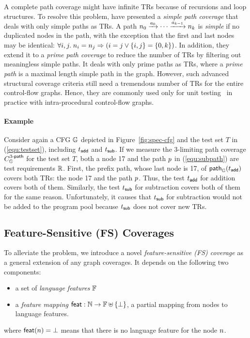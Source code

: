 
A complete path coverage might have infinite TRs because of recursions and loop
structures.
%
To resolve this problem, \citet{testing} have presented a \textit{simple path
coverage} that deals with only simple paths as TRs.
%
A path $n_0 \xrightarrow{a_0} \cdots \xrightarrow{a_{k-1}} n_k$ is
\textit{simple} if no duplicated nodes in the path, with the exception that the
first and last nodes may be identical: $\forall i, j. \; n_i = n_j
\Rightarrow (i = j \vee \{ i, j \} = \{ 0, k \})$.
%
In addition, they extend it to a \textit{prime path coverage} to reduce the
number of TRs by filtering out meaningless simple paths.
%
It deals with only prime paths as TRs, where a \textit{prime path}
is a maximal length simple path in the graph.
%
However, such advanced structural coverage criteria still need a tremendous
number of TRs for the entire control-flow graphs.
%
Hence, they are commonly used only for unit testing~\cite{unit-test} in practice
with intra-procedural control-flow graphs.


\paragraph{\textbf{Example}}
%
Consider again a CFG $\mathbb{G}$ depicted in Figure~\ref{fig:spec-cfg} and the test
set $T$ in (\ref{equ:testset}), including $t_{\textsf{add}}$ and $t_{\textsf{sub}}$.
%
If we measure the $3$-limiting path coverage $C_{\mathbb{G}}^{{3}\textsf{-path}}$ for the test
set $T$, both a node 17 and the path $p$ in (\ref{equ:subpath}) are test
requirements $\mathbb{R}$.
%
First, the prefix path, whose last node is 17, of $\textsf{path}_{\mathbb{G}}(t_{\textsf{add}})$
covers both TRs: the node 17 and the path $p$.
%
Thus, the test $t_{\textsf{add}}$ for addition covers both of them.
%
Similarly, the test $t_{\textsf{sub}}$ for subtraction covers both of them for the same
reason.
%
Unfortunately, it causes that $t_{\textsf{sub}}$ for subtraction would not be added to
the program pool because $t_{\textsf{sub}}$ does not cover new TRs.




\subsection{Feature-Sensitive (FS) Coverages}

To alleviate the problem, we introduce a novel \textit{feature-sensitive (FS)
coverage} as a general extension of any graph coverages.
%
It depends on the following two components:
%
\begin{itemize}
  \item a set of \textit{language features} $\mathbb{F}$
  \item a \textit{feature mapping} $\textsf{feat}: \mathbb{N} \rightarrow \mathbb{F}
    \uplus \{ \bot \}$, a partial mapping from nodes to language features.
\end{itemize}
%
where $\textsf{feat}(n) = \bot$ means that there is no language feature for the
node $n$.


